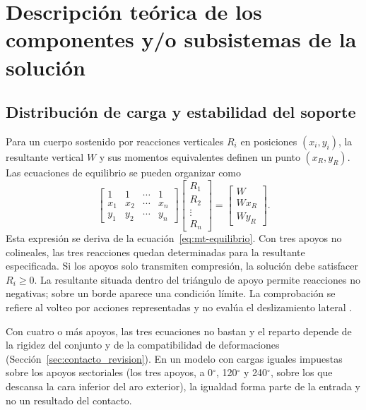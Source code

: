 \section{Descripción teórica de los componentes y/o subsistemas de la solución}

\subsection{Distribución de carga y estabilidad del soporte}

Para un cuerpo sostenido por reacciones verticales $R_i$ en posiciones $(x_i,y_i)$, la resultante vertical $W$ y sus momentos equivalentes definen un punto $(x_R,y_R)$. Las ecuaciones de equilibrio se pueden organizar como
\begin{equation}
  \begin{bmatrix}
    1 & 1 & \cdots & 1\\
    x_1 & x_2 & \cdots & x_n\\
    y_1 & y_2 & \cdots & y_n
  \end{bmatrix}
  \begin{bmatrix}R_1\\R_2\\\vdots\\R_n\end{bmatrix}
  =\begin{bmatrix}W\\Wx_R\\Wy_R\end{bmatrix}.
  \label{eq:teo-reparto}
\end{equation}
Esta expresión se deriva de la ecuación~\eqref{eq:mt-equilibrio}. Con tres apoyos no colineales, las tres reacciones quedan determinadas para la resultante especificada. Si los apoyos solo transmiten compresión, la solución debe satisfacer $R_i\geq0$. La resultante situada dentro del triángulo de apoyo permite reacciones no negativas; sobre un borde aparece una condición límite. La comprobación se refiere al volteo por acciones representadas y no evalúa el deslizamiento lateral \cite{shigley2015}.

Con cuatro o más apoyos, las tres ecuaciones no bastan y el reparto depende de la rigidez del conjunto y de la compatibilidad de deformaciones (Sección~\ref{sec:contacto_revision}). En un modelo con cargas iguales impuestas sobre los apoyos sectoriales (los tres apoyos, a 0$^\circ$, 120$^\circ$ y 240$^\circ$, sobre los que descansa la cara inferior del aro exterior), la igualdad forma parte de la entrada y no un resultado del contacto.

